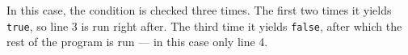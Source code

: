In this case, the condition is checked three times. The first two times it yields \texttt{true}, so line 3 is run right after. The third time it yields \texttt{false}, after which the rest of the program is run --- in this case only line 4.


%
%
%
%
